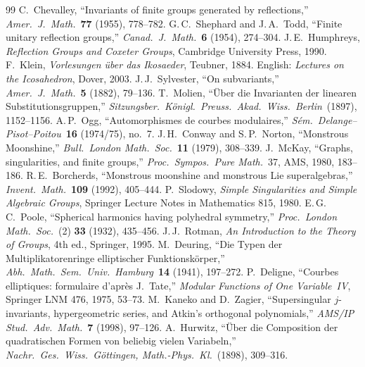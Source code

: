 \documentclass[11pt,letterpaper]{article}
\theoremstyle{definition}
\begin{document}
\begin{thebibliography}{99}
C.~Chevalley, ``Invariants of finite groups generated by reflections,''
\emph{Amer.\ J.\ Math.}\ \textbf{77} (1955), 778--782.
G.\,C.~Shephard and J.\,A.~Todd, ``Finite unitary reflection groups,''
\emph{Canad.\ J.\ Math.}\ \textbf{6} (1954), 274--304.
J.\,E.~Humphreys, \emph{Reflection Groups and Coxeter Groups},
Cambridge University Press, 1990.
F.~Klein, \emph{Vorlesungen \"uber das Ikosaeder}, Teubner, 1884.
English: \emph{Lectures on the Icosahedron}, Dover, 2003.
J.\,J.~Sylvester, ``On subvariants,''
\emph{Amer.\ J.\ Math.}\ \textbf{5} (1882), 79--136.
T.~Molien, ``\"Uber die Invarianten der linearen Substitutionsgruppen,''
\emph{Sitzungsber.\ K\"onigl.\ Preuss.\ Akad.\ Wiss.\ Berlin}\ (1897), 1152--1156.
A.\,P.~Ogg, ``Automorphismes de courbes modulaires,''
\emph{S\'em.\ Delange--Pisot--Poitou}\ \textbf{16} (1974/75), no.~7.
J.\,H.~Conway and S.\,P.~Norton, ``Monstrous Moonshine,''
\emph{Bull.\ London Math.\ Soc.}\ \textbf{11} (1979), 308--339.
J.~McKay, ``Graphs, singularities, and finite groups,''
\emph{Proc.\ Sympos.\ Pure Math.}~37, AMS, 1980, 183--186.
R.\,E.~Borcherds, ``Monstrous moonshine and monstrous Lie superalgebras,''
\emph{Invent.\ Math.}\ \textbf{109} (1992), 405--444.
P.~Slodowy, \emph{Simple Singularities and Simple Algebraic Groups},
Springer Lecture Notes in Mathematics 815, 1980.
E.\,G.\,C.~Poole, ``Spherical harmonics having polyhedral symmetry,''
\emph{Proc.\ London Math.\ Soc.}\ (2) \textbf{33} (1932), 435--456.
J.\,J.~Rotman, \emph{An Introduction to the Theory of Groups}, 4th ed.,
Springer, 1995.
M.~Deuring, ``Die Typen der Multiplikatorenringe elliptischer Funktionsk\"orper,''
\emph{Abh.\ Math.\ Sem.\ Univ.\ Hamburg}\ \textbf{14} (1941), 197--272.
P.~Deligne, ``Courbes elliptiques: formulaire d'apr\`es J.\ Tate,''
\emph{Modular Functions of One Variable~IV}, Springer LNM 476, 1975, 53--73.
M.~Kaneko and D.~Zagier, ``Supersingular $j$-invariants, hypergeometric series, and Atkin's orthogonal polynomials,''
\emph{AMS/IP Stud.\ Adv.\ Math.}\ \textbf{7} (1998), 97--126.
A.~Hurwitz, ``\"Uber die Composition der quadratischen Formen von beliebig vielen Variabeln,''
\emph{Nachr.\ Ges.\ Wiss.\ G\"ottingen, Math.-Phys.\ Kl.}\ (1898), 309--316.

\end{thebibliography}
\end{document}
